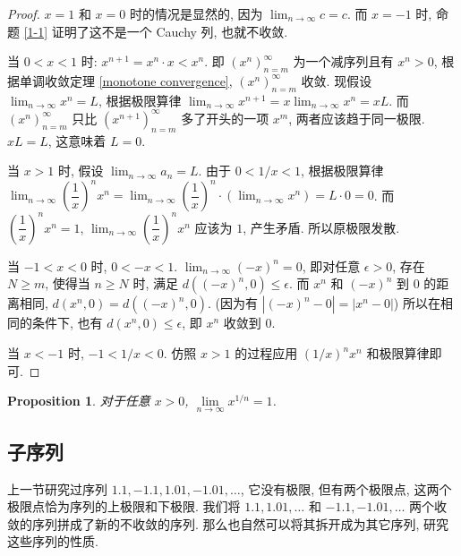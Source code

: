 \documentclass[UTF8]{ctexart}
\theoremstyle{mystyle}
\newtheorem{proposition}{Proposition}[section]
\theoremstyle{myremark}
\theoremstyle{plain}
\begin{document}
\begin{proof}
    $ x = 1 $ 和 $ x = 0 $ 时的情况是显然的, 因为 $ \displaystyle \lim_{n \to \infty} c = c $. 而 $ x = -1 $ 时, 命题 \ref{1-1} 证明了这不是一个 Cauchy 列, 也就不收敛.

    当 $ 0 < x < 1 $ 时: $ x^{n + 1} = x^n \cdot x < x^n $. 即 $ (x^n)_{n = m}^\infty $ 为一个减序列且有 $ x^n > 0 $, 根据单调收敛定理 \ref{monotone convergence}, $ (x^n)_{n = m}^\infty $ 收敛. 现假设 $ \displaystyle \lim_{n \to \infty} x^n = L $, 根据极限算律 $ \displaystyle \lim_{n \to \infty} x^{n + 1} = x \lim_{n \to \infty} x^n = xL $. 而 $ (x^n)_{n = m}^\infty $ 只比 $ (x^{n + 1})_{n = m}^\infty $ 多了开头的一项 $ x^m $, 两者应该趋于同一极限. $ xL = L $, 这意味着 $ L = 0 $.

    当 $ x > 1 $ 时, 假设 $ \displaystyle \lim_{n \to \infty} a_n = L $. 由于 $ \displaystyle 0 < 1/x < 1 $, 根据极限算律 $ \displaystyle \lim_{n \to \infty}{\left( \dfrac{1}{x} \right)^n x^n} = \lim_{n \to \infty} \left( \dfrac{1}{x} \right)^n \cdot \left( \lim_{n \to \infty} x^n \right) = L \cdot 0 = 0 $. 而 $ \displaystyle \left( \dfrac{1}{x} \right)^n x^n = 1 $, $ \displaystyle \lim_{n \to \infty}{\left( \dfrac{1}{x} \right)^n x^n} $ 应该为 $ 1 $, 产生矛盾. 所以原极限发散.

    当 $ -1 < x < 0 $ 时, $ 0 < -x < 1 $. $ \displaystyle \lim_{n \to \infty} (-x)^n = 0 $, 即对任意 $ \epsilon > 0 $, 存在 $ N \geqslant m $, 使得当 $ n \geqslant N $ 时, 满足 $ d \left( (-x)^n, 0 \right) \leqslant \epsilon $. 而 $ x^n $ 和 $ (-x)^n $ 到 $ 0 $ 的距离相同, $ d(x^n, 0) = d \left( (-x)^n, 0 \right) $. (因为有 $ |(-x)^n - 0| = |x^n - 0| $) 所以在相同的条件下, 也有 $ d(x^n, 0) \leqslant \epsilon $, 即 $ x^n $ 收敛到 $ 0 $.

    当 $ x < -1 $ 时, $ -1 < 1/x < 0 $. 仿照 $ x > 1 $ 的过程应用 $ (1/x)^n x^n $ 和极限算律即可.
\end{proof}

\begin{proposition}
    对于任意 $ x > 0 $, $ \lim\limits_{n\to\infty} x^{1/n} = 1 $.
\end{proposition}


\subsection{子序列}
上一节研究过序列 $ 1.1, -1.1, 1.01, -1.01, \dots $, 它没有极限, 但有两个极限点, 这两个极限点恰为序列的上极限和下极限. 我们将 $ 1.1, 1.01, \dots $ 和 $ -1.1, -1.01, \dots$ 两个收敛的序列拼成了新的不收敛的序列. 那么也自然可以将其拆开成为其它序列, 研究这些序列的性质.
\end{document}
